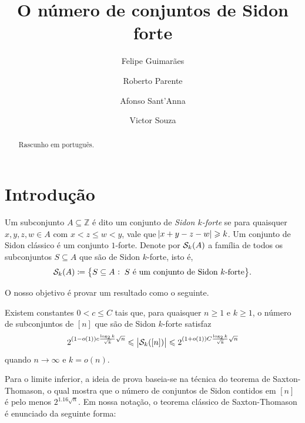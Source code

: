 \documentclass[reqno,a4paper,12pt]{amsart}
\begin{document}
\title{O número de conjuntos de Sidon forte}

\author{Felipe Guimarães}
\author{Roberto Parente}
\author{Afonso Sant'Anna}
\author{Victor Souza}


\begin{abstract}
  Rascunho em português.
\end{abstract}

\maketitle


\section{Introdução}
\label{sec:intro}

Um subconjunto $A \subseteq \mathbb{Z}$ é dito um conjunto de \emph{Sidon $k$-forte} se para quaisquer $x, y, z, w \in A$ com $x < z \leq w < y$, vale que $\abs{x + y - z - w} \geq k$.
Um conjunto de Sidon clássico é um conjunto $1$-forte.
Denote por $\cS_k(A)$ a família de todos os subconjuntos $S \subseteq A$ que são de Sidon $k$-forte, isto é,
\begin{equation*}
  \cS_k(A) \defined \set[\big]{S \subseteq A \st \text{$S$ é um conjunto de Sidon $k$-forte}}.
\end{equation*}

O nosso objetivo é provar um resultado como o seguinte.

\begin{theorem}
  \label{theoprincp}
  Existem constantes $0 < c \leq C$ tais que, para quaisquer $n \ge 1$ e $k \ge 1$, o número de subconjuntos de $[n]$ que são de Sidon $k$-forte satisfaz
  \begin{equation*}
    2^{(1- o(1) )c \frac{\log_2 k}{\sqrt{k}}\sqrt{n}} \leq \card[\big]{\cS_k([n])} \leq 2^{(1+ o(1))C \frac{\log_2 k}{\sqrt{k}}\sqrt{n}}
  \end{equation*}
  quando $n \to \infty$ e $k = o(n)$.
\end{theorem}

Para o limite inferior, a ideia de prova baseia-se na técnica do teorema de Saxton-Thomason, o qual mostra que o número de conjuntos de Sidon contidos em $[n]$ é pelo menos $2^{1.16\sqrt{n}}$. Em nossa notação, o teorema clássico de Saxton-Thomason é enunciado da seguinte forma:
\end{document}
